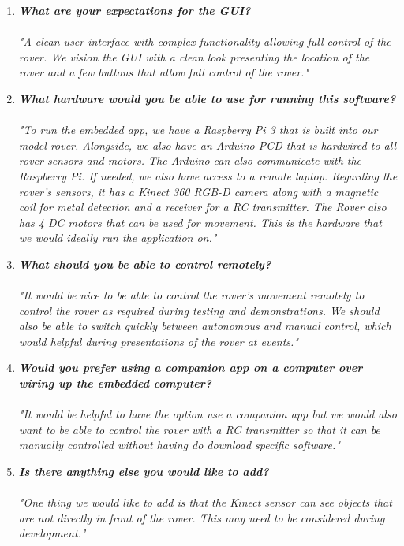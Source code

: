 \documentclass[11pt]{report}
\begin{document}
				\begin{enumerate}
					\item{\emph{\textbf{What are your expectations for the GUI?}}}\\\\
					\emph{"A clean user interface with complex functionality allowing full control of the rover. We vision the GUI with a clean look presenting the location of the rover and a few buttons that allow full control of the rover."}
					\item{\emph{\textbf{What hardware would you be able to use for running this software?}}}\\\\
					\emph{"To run the embedded app, we have a Raspberry Pi 3 that is built into our model rover. Alongside, we also have an Arduino PCD that is hardwired to all rover sensors and motors. The Arduino can also communicate with the Raspberry Pi. If needed, we also have access to a remote laptop. Regarding the rover's sensors, it has a Kinect 360 RGB-D camera along with a magnetic coil for metal detection and a receiver for a RC transmitter. The Rover also has 4 DC motors that can be used for movement. This is the hardware that we would ideally run the application on."}
					\item{\emph{\textbf{What should you be able to control remotely?}}}\\\\
					\emph{"It would be nice to be able to control the rover's movement remotely to control the rover as required during testing and demonstrations. We should also be able to switch quickly between autonomous and manual control, which would helpful during presentations of the rover at events."}
					\item{\emph{\textbf{Would you prefer using a companion app on a computer over wiring up the embedded computer?}}}\\\\
					\emph{"It would be helpful to have the option use a companion app but we would also want to be able to control the rover with a RC transmitter so that it can be manually controlled without having do download specific software."}
					\item{\emph{\textbf{Is there anything else you would like to add?}}}\\\\
					\emph{"One thing we would like to add is that the Kinect sensor can see objects that are not directly in front of the rover. This may need to be considered during development."}
				\end{enumerate}
\end{document}
